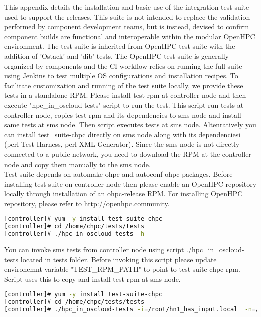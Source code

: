 This appendix details the installation and basic use of the integration test suite used to support the releases. This suite is not intended to replace the validation performed by component development teams, but is instead, devised to confirm component builds are functional and interoperable within the modular OpenHPC environment. The test suite is inherited from OpenHPC test suite with the addition of 'Ostack' and 'dib' tests. The OpenHPC test suite is generally organized by components and the CI workflow relies on running the full suite using Jenkins to test multiple OS configurations and installation recipes. To facilitate customization and running of the test suite locally, we provide these tests in a standalone RPM. Please install test rpm at controller node and then execute "hpc\_in\_oscloud-tests" script to run the test. This script run tests at controller node, copies test rpm  and its dependencies to sms node and install same tests at sms node. Then script executes tests at sms node. Altenratively you can install test\_suite-chpc directly on sms node along with its dependenciesi (perl-Test-Harness, perl-XML-Generator). Since the sms node is not directly connected to a public network, you need to download the RPM at the controller node and copy them manually to the sms node. \\
Test suite depends on automake-ohpc and autoconf-ohpc packages. Before installing test suite on controller node then please enable an OpenHPC repository locally through installation of an ohpc-release RPM. For installing OpenHPC repository, please refer to http://openhpc.community.
\begin{lstlisting}[language=bash,keywords={},upquote=true]
[controller]# yum -y install test-suite-chpc
[controller]# cd /home/chpc/tests/tests
[controller]# ./hpc_in_oscloud-tests -h
\end{lstlisting}
You can invoke sms tests from controller node using script ./hpc\_in\_oscloud-tests located in tests folder. Before invoking this script please update environemnt variable "TEST\_RPM\_PATH" to point to test-suite-chpc rpm. Script uses this to copy and install test rpm at sms node.

\begin{lstlisting}[language=bash,keywords={},upquote=true]
[controller]# yum -y install test-suite-chpc
[controller]# cd /home/chpc/tests/tests
[controller]# ./hpc_in_oscloud-tests -i=/root/hn1_has_input.local  -n=/root/hn1_has_inventory -rs
\end{lstlisting}

